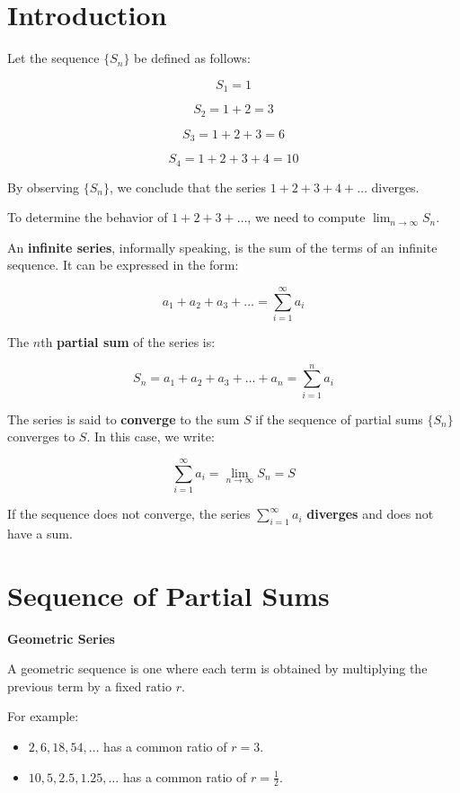 \documentclass[
]{book}
\providecommand{\tightlist}{%
  \setlength{\itemsep}{0pt}\setlength{\parskip}{0pt}}
\theoremstyle{definition}
\theoremstyle{definition}
\theoremstyle{definition}
\theoremstyle{definition}
\theoremstyle{remark}
\begin{document}
\section{Introduction}\label{introduction-1}

Let the sequence \(\{S_n\}\) be defined as follows:

\[
S_1 = 1
\]

\[
S_2 = 1 + 2 = 3
\]

\[
S_3 = 1 + 2 + 3 = 6
\]

\[
S_4 = 1 + 2 + 3 + 4 = 10
\]

By observing \(\{S_n\}\), we conclude that the series \(1 + 2 + 3 + 4 + \dots\) diverges.

To determine the behavior of \(1 + 2 + 3 + \dots\), we need to compute \(\lim_{n \to \infty} S_n\).

An \textbf{infinite series}, informally speaking, is the sum of the terms of an infinite sequence. It can be expressed in the form:

\[
a_1 + a_2 + a_3 + \dots = \sum_{i=1}^{\infty} a_i
\]

The \(n\)th \textbf{partial sum} of the series is:

\[
S_n = a_1 + a_2 + a_3 + \dots + a_n = \sum_{i=1}^{n} a_i
\]

The series is said to \textbf{converge} to the sum \(S\) if the sequence of partial sums \(\{S_n\}\) converges to \(S\). In this case, we write:

\[
\sum_{i=1}^{\infty} a_i = \lim_{n \to \infty} S_n = S
\]

If the sequence does not converge, the series \(\sum_{i=1}^{\infty} a_i\) \textbf{diverges} and does not have a sum.

\section{Sequence of Partial Sums}\label{sequence-of-partial-sums}

\textbf{Geometric Series}

A geometric sequence is one where each term is obtained by multiplying the previous term by a fixed ratio \(r\).

For example:

\begin{itemize}
\tightlist
\item
  \(2, 6, 18, 54, \dots\) has a common ratio of \(r = 3\).
\item
  \(10, 5, 2.5, 1.25, \dots\) has a common ratio of \(r = \frac{1}{2}\).
\end{itemize}
\end{document}
